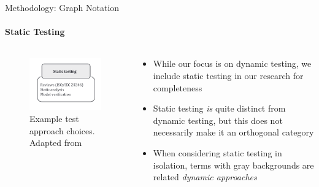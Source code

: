 \documentclass{beamer}
\begin{document}
\begin{frame}[t]{Methodology: Graph Notation}
    \framesubtitle{Static Testing}
    \begin{columns}[T]
        \begin{column}{.4\textwidth}
            \begin{figure}
                \centering
                \includegraphics[width=\linewidth]{assets/images/test approach static testing}
                \caption{Example test approach choices. Adapted from \citep[Fig.~2]{IEEE2022}}
            \end{figure}
        \end{column}
        \begin{column}{.6\textwidth}
            \begin{itemize}
                \item \pause While our focus is on dynamic testing, we include
                      static testing in our research for completeness \pause
                \item Static testing \emph{is} quite distinct from dynamic
                      testing, but this does not necessarily make it an
                      orthogonal category \pause
                \item When considering static testing in isolation, terms with
                      gray backgrounds are related \emph{dynamic approaches}


\end{itemize}
\end{column}
\end{columns}
\end{frame}
\end{document}
